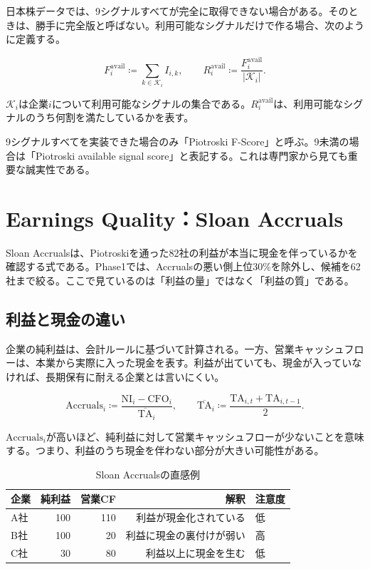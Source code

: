 \documentclass[11pt,a4paper]{article}
\newcommand{\NI}{\mathrm{NI}}
\newcommand{\TA}{\mathrm{TA}}
\newcommand{\CFO}{\mathrm{CFO}}
\newcommand{\Acc}{\mathrm{Accruals}}
\begin{document}
日本株データでは、9シグナルすべてが完全に取得できない場合がある。そのときは、勝手に完全版と呼ばない。利用可能なシグナルだけで作る場合、次のように定義する。

\begin{equation}
F^{\mathrm{avail}}_i \coloneqq \sum_{k\in \mathcal{K}_i} I_{i,k},
\qquad
R^{\mathrm{avail}}_i \coloneqq \frac{F^{\mathrm{avail}}_i}{\lvert\mathcal{K}_i\rvert}.
\label{eq:piotroski-avail}
\end{equation}

$\mathcal{K}_i$は企業$i$について利用可能なシグナルの集合である。$R^{\mathrm{avail}}_i$は、利用可能なシグナルのうち何割を満たしているかを表す。

\begin{warnbox}[表記上の注意]
9シグナルすべてを実装できた場合のみ「Piotroski F-Score」と呼ぶ。9未満の場合は「Piotroski available signal score」と表記する。これは専門家から見ても重要な誠実性である。
\end{warnbox}

\clearpage
\section{Earnings Quality：Sloan Accruals}
\begin{keybox}
Sloan Accrualsは、Piotroskiを通った82社の利益が本当に現金を伴っているかを確認する式である。Phase1では、Accrualsの悪い側上位30\%を除外し、候補を62社まで絞る。ここで見ているのは「利益の量」ではなく「利益の質」である。
\end{keybox}

\subsection{利益と現金の違い}

企業の純利益は、会計ルールに基づいて計算される。一方、営業キャッシュフローは、本業から実際に入った現金を表す。利益が出ていても、現金が入っていなければ、長期保有に耐える企業とは言いにくい。

\begin{equation}
\Acc_i \coloneqq \frac{\NI_i - \CFO_i}{\overline{\TA}_i},
\qquad
\overline{\TA}_i \coloneqq \frac{\TA_{i,t}+\TA_{i,t-1}}{2}.
\label{eq:sloan}
\end{equation}

$\Acc_i$が高いほど、純利益に対して営業キャッシュフローが少ないことを意味する。つまり、利益のうち現金を伴わない部分が大きい可能性がある。

\begin{table}[tbp]
\caption{Sloan Accrualsの直感例}
\label{tab:sloan-example}
\centering
\small
\begin{tabular}{lrrrl}
\toprule
企業 & 純利益 & 営業CF & 解釈 & 注意度 \\
\midrule
A社 & 100 & 110 & 利益が現金化されている & 低 \\
B社 & 100 & 20 & 利益に現金の裏付けが弱い & 高 \\
C社 & 30 & 80 & 利益以上に現金を生む & 低 \\
\bottomrule
\end{tabular}
\end{table}
\end{document}
